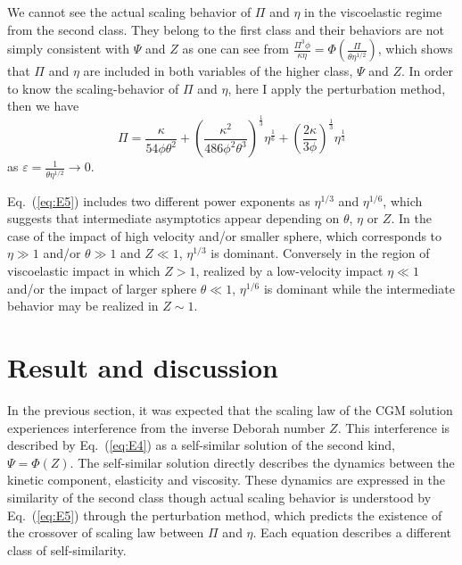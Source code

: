 \documentclass[default,iicol,10pt]{sn-jnl}%
\theoremstyle{thmstyleone}%
\theoremstyle{thmstyletwo}%
\theoremstyle{thmstylethree}%
\begin{document}
We cannot see the actual scaling behavior of $\Pi$ and $\eta$ in the viscoelastic regime from the second class. They belong to the first class and their behaviors are not simply consistent with $\Psi$ and $Z$ as one can see from $\frac{\Pi^3 \phi}{\kappa \eta} = \Phi \left( \frac{\Pi}{\theta \eta^{1/2}} \right)$, which shows that $\Pi$ and $\eta$ are included in both variables of the higher class, $\Psi$ and $Z$. In order to know the scaling-behavior of $\Pi$ and $\eta$, here I apply the perturbation method\cite{Holmes}, then we have
\begin{equation}
\Pi = \frac{\kappa}{54 \phi \theta^2 } + \left(\frac{\kappa^2 }{486 \phi^2 \theta^{3} }\right)^{\frac{1}{3}} \eta^{\frac{1}{6}} + \left( \frac{2 \kappa}{3 \phi} \right)^{\frac{1}{3}}\eta^{\frac{1}{3}}
\label{eq:E5}
\end{equation}
as $\varepsilon = \frac{1}{\theta \eta^{1/2}} \rightarrow 0$\cite{SMDer}.

Eq.~(\ref{eq:E5}) includes two different power exponents as $\eta^{1/3}$ and $\eta^{1/6}$, which suggests that intermediate asymptotics appear depending on $\theta$, $\eta$ or $Z$. In the case of the impact of high velocity and/or smaller sphere, which corresponds to $\eta \gg 1$ and/or $\theta \gg 1$ and $Z \ll 1$, $\eta^{1/3}$ is dominant. Conversely in the region of viscoelastic impact in which $Z > 1$, realized by a low-velocity impact $\eta \ll 1$ and/or the impact of larger sphere $\theta \ll 1$, $\eta^{1/6}$ is dominant while the intermediate behavior may be realized in $Z \sim 1$.  

\section{Result and discussion}
  
In the previous section, it was expected that the scaling law of the CGM solution experiences interference from the inverse Deborah number $Z$. This interference is described by Eq.~(\ref{eq:E4}) as a self-similar solution of the second kind, $\Psi = \Phi \left(Z \right)$. The self-similar solution directly describes the dynamics between the kinetic component, elasticity and viscosity. These dynamics are expressed in the similarity of the second class though actual scaling behavior is understood by Eq.~(\ref{eq:E5}) through the perturbation method, which predicts the existence of the crossover of scaling law between $\Pi$ and $\eta$. Each equation describes a different class of self-similarity.   
\end{document}
